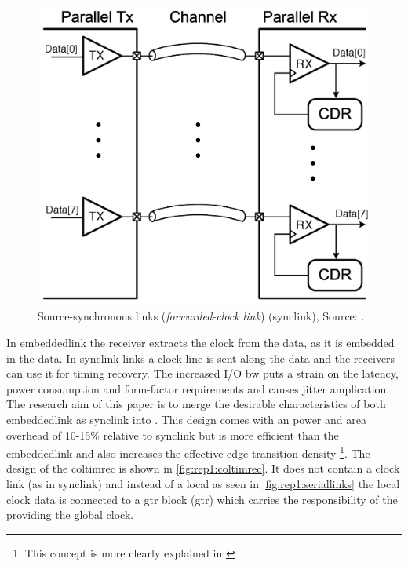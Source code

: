 \begin{figure}[]
	\centering
	\includegraphics[width=0.8\linewidth]{Figures/Rep1EnsembleSerLinks.png}
	\caption{Source-synchronous links (\textit{forwarded-clock link}) (\ac{synclink}), Source: \cite{agrawal20098}.} 
    \label{fig:rep1:synclinks}
\end{figure}

In \ac{embeddedlink} the receiver extracts the clock from the data, as it is embedded in the data. 
In \ac{synclink} links a clock line is sent along the data and the receivers can use it for timing recovery. 
\objective
The increased I/O \ac{bw} puts a strain on the latency, power consumption and form-factor requirements and causes jitter amplication. 
\motive
The research aim of this paper is to merge the desirable characteristics of both \ac{embeddedlink} as \ac{synclink} into .
This design comes with an power and area overhead of 10-15\% relative to \ac{synclink} but is more efficient than the \ac{embeddedlink} and also increases the effective edge transition density \footnote{This concept is more clearly explained in \cite{miller2005transition}}.
\summary
The design of the \ac{coltimrec} is shown in \cref{fig:rep1:coltimrec}. 
It does not contain a clock link (as in \ac{synclink}) and instead of a local  as seen in \cref{fig:rep1:seriallinks} the local clock data is connected to a \acl{gtr} block (\ac{gtr}) which carries the responsibility of the providing the global clock.

